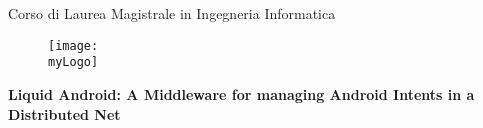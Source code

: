 %
%
\cleardoublepage
%
%
\thispagestyle{empty}
%
%
%

\begin {center}
{
	\fontsize{1cm}{1.2em}\textbf{\textsc{\myUni}}\\[1cm]
}
\end{center}
\begin{center} 
{
	\fontsize{0.6cm}{1em}\textnormal{\myFaculty}\\[0.2cm]
	\fontsize{0.6cm}{1em}\textnormal{Corso di Laurea Magistrale in Ingegneria Informatica}
}
\end{center}

\begin{figure}[h]
	\centering
 	\texttt{[image: \\myLogo]}
\end{figure} 
 
\begin {center}
{
	\fontsize{0.8cm}{1em}\textbf{Liquid Android: A Middleware for managing Android Intents in a Distributed Net} \\[3cm]
}
\end{center}

